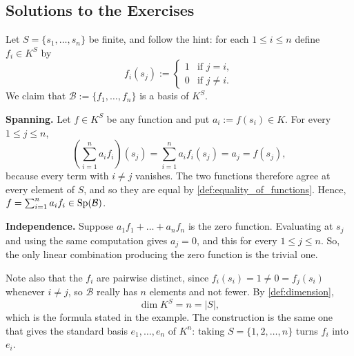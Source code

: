 \subsection{Solutions to the Exercises}
\label{sec:solutions_bases_part_b}

\begin{exercisesolution*}
\label{sol:basis_of_function_space}
Let $S = \{s_1, \dots, s_n\}$ be finite, and follow the hint: for each $1 \le i \le n$ define $f_i \in K^S$ by
\[
f_i(s_j) :=
\begin{cases}
1 & \text{if } j = i, \\
0 & \text{if } j \ne i.
\end{cases}
\]
We claim that $\mathcal{B} := \{f_1, \dots, f_n\}$ is a basis of $K^S$.

\textbf{Spanning.} Let $f \in K^S$ be any function and put $a_i := f(s_i) \in K$. For every $1 \le j \le n$,
\[
\left( \sum_{i=1}^{n} a_i f_i \right)(s_j) = \sum_{i=1}^{n} a_i f_i(s_j) = a_j = f(s_j),
\]
because every term with $i \ne j$ vanishes. The two functions therefore agree at every element of $S$, and so they are equal by \cref{def:equality_of_functions}. Hence, $f = \sum_{i=1}^{n} a_i f_i \in \operatorname{Sp}(\mathcal{B})$.

\textbf{Independence.} Suppose $a_1 f_1 + \dots + a_n f_n$ is the zero function. Evaluating at $s_j$ and using the same computation gives $a_j = 0$, and this for every $1 \le j \le n$. So, the only linear combination producing the zero function is the trivial one.

Note also that the $f_i$ are pairwise distinct, since $f_i(s_i) = 1 \ne 0 = f_j(s_i)$ whenever $i \ne j$, so $\mathcal{B}$ really has $n$ elements and not fewer. By \cref{def:dimension},
\[
\dim K^S = n = |S|,
\]
which is the formula stated in the example. The construction is the same one that gives the standard basis $e_1, \dots, e_n$ of $K^n$: taking $S = \{1, 2, \dots, n\}$ turns $f_i$ into $e_i$.
\end{exercisesolution*}




